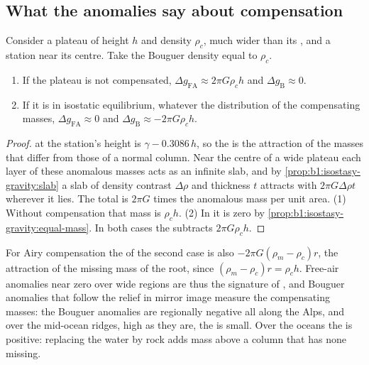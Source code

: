 \subsection*{What the anomalies say about compensation}

\begin{proposition}\label{prop:b1:isostasy-gravity:broad}
Consider a plateau of height $h$ and density $\rho_c$, much wider than its
, and a station near its centre. Take the Bouguer density
equal to $\rho_c$.
\begin{enumerate}
  \item If the plateau is not compensated, $\Delta g_{\mathrm{FA}} \approx
        2\pi G\rho_c h$ and $\Delta g_{\mathrm B} \approx 0$.
  \item If it is in isostatic equilibrium, whatever the distribution of the
        compensating masses, $\Delta g_{\mathrm{FA}} \approx 0$ and
        $\Delta g_{\mathrm B} \approx -2\pi G\rho_c h$.
\end{enumerate}
\end{proposition}

\begin{proof}
 at the station's height is $\gamma - 0.3086\,h$, so the  is the attraction of the masses that differ from those of a normal
column. Near the centre of a wide plateau each layer of these anomalous masses
acts as an infinite slab, and by \cref{prop:b1:isostasy-gravity:slab} a slab of
density contrast $\Delta\rho$ and thickness $t$ attracts with $2\pi G\Delta\rho
t$ wherever it lies. The total is $2\pi G$ times the anomalous mass per unit
area. (1) Without compensation that mass is $\rho_c h$. (2) In  it is
zero by \cref{prop:b1:isostasy-gravity:equal-mass}. In both cases the  subtracts $2\pi G\rho_c h$.
\end{proof}

For Airy compensation the  of the second case is also
$-2\pi G(\rho_m - \rho_c)r$, the attraction of the missing mass of the root,
since $(\rho_m - \rho_c)r = \rho_c h$. Free-air anomalies near zero over wide
regions are thus the signature of , and Bouguer anomalies that follow
the relief in mirror image measure the compensating masses: the Bouguer
anomalies are regionally negative all along the Alps, and over the mid-ocean
ridges, high as they are, the  is small. Over the oceans the
 is positive: replacing the water by rock adds mass above a
column that has none missing.

